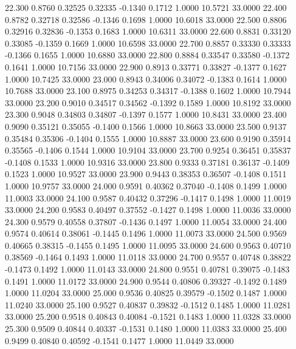   22.300   0.8760   0.32525   0.32335  -0.1340   0.1712   1.0000  10.5721  33.0000
  22.400   0.8782   0.32718   0.32586  -0.1346   0.1698   1.0000  10.6018  33.0000
  22.500   0.8806   0.32916   0.32836  -0.1353   0.1683   1.0000  10.6311  33.0000
  22.600   0.8831   0.33120   0.33085  -0.1359   0.1669   1.0000  10.6598  33.0000
  22.700   0.8857   0.33330   0.33333  -0.1366   0.1655   1.0000  10.6880  33.0000
  22.800   0.8884   0.33547   0.33580  -0.1372   0.1641   1.0000  10.7156  33.0000
  22.900   0.8913   0.33771   0.33827  -0.1377   0.1627   1.0000  10.7425  33.0000
  23.000   0.8943   0.34006   0.34072  -0.1383   0.1614   1.0000  10.7688  33.0000
  23.100   0.8975   0.34253   0.34317  -0.1388   0.1602   1.0000  10.7944  33.0000
  23.200   0.9010   0.34517   0.34562  -0.1392   0.1589   1.0000  10.8192  33.0000
  23.300   0.9048   0.34803   0.34807  -0.1397   0.1577   1.0000  10.8431  33.0000
  23.400   0.9090   0.35121   0.35055  -0.1400   0.1566   1.0000  10.8663  33.0000
  23.500   0.9137   0.35484   0.35306  -0.1404   0.1555   1.0000  10.8887  33.0000
  23.600   0.9190   0.35914   0.35565  -0.1406   0.1544   1.0000  10.9104  33.0000
  23.700   0.9254   0.36451   0.35837  -0.1408   0.1533   1.0000  10.9316  33.0000
  23.800   0.9333   0.37181   0.36137  -0.1409   0.1523   1.0000  10.9527  33.0000
  23.900   0.9443   0.38353   0.36507  -0.1408   0.1511   1.0000  10.9757  33.0000
  24.000   0.9591   0.40362   0.37040  -0.1408   0.1499   1.0000  11.0003  33.0000
  24.100   0.9587   0.40432   0.37296  -0.1417   0.1498   1.0000  11.0019  33.0000
  24.200   0.9583   0.40497   0.37552  -0.1427   0.1498   1.0000  11.0036  33.0000
  24.300   0.9579   0.40558   0.37807  -0.1436   0.1497   1.0000  11.0054  33.0000
  24.400   0.9574   0.40614   0.38061  -0.1445   0.1496   1.0000  11.0073  33.0000
  24.500   0.9569   0.40665   0.38315  -0.1455   0.1495   1.0000  11.0095  33.0000
  24.600   0.9563   0.40710   0.38569  -0.1464   0.1493   1.0000  11.0118  33.0000
  24.700   0.9557   0.40748   0.38822  -0.1473   0.1492   1.0000  11.0143  33.0000
  24.800   0.9551   0.40781   0.39075  -0.1483   0.1491   1.0000  11.0172  33.0000
  24.900   0.9544   0.40806   0.39327  -0.1492   0.1489   1.0000  11.0204  33.0000
  25.000   0.9536   0.40825   0.39579  -0.1502   0.1487   1.0000  11.0240  33.0000
  25.100   0.9527   0.40837   0.39832  -0.1512   0.1485   1.0000  11.0281  33.0000
  25.200   0.9518   0.40843   0.40084  -0.1521   0.1483   1.0000  11.0328  33.0000
  25.300   0.9509   0.40844   0.40337  -0.1531   0.1480   1.0000  11.0383  33.0000
  25.400   0.9499   0.40840   0.40592  -0.1541   0.1477   1.0000  11.0449  33.0000
